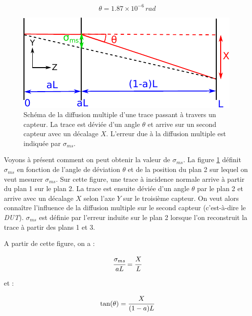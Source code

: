   \begin{equation}
   \theta = 1.87 \times 10^{-6} \, rad
  \end{equation}
  
  \begin{figure}[!htb]
    \begin{center}
      \includegraphics[scale=1.5]{./figures/diffusion_multiple.pdf}
      \caption{Sch\'ema de la diffusion multiple d'une trace passant \`a travers un capteur. La trace est d\'evi\'ee d'un angle $\theta$ et arrive sur un second capteur avec un d\'ecalage $X$. L'erreur due \`a la diffusion multiple est indiqu\'ee par $\sigma_{ms}$.}
      \label{fig:schema_diff_multiple}
    \end{center}
  \end{figure}  
  
  Voyons \`a pr\'esent comment on peut obtenir la valeur de $\sigma_{ms}$. La figure \ref{fig:schema_diff_multiple} d\'efinit $\sigma_{ms}$ en fonction de l'angle de d\'eviation $\theta$ et de la position du plan 2 sur lequel on veut mesurer $\sigma_{ms}$. Sur cette figure, une trace \`a incidence normale arrive \`a partir du plan 1 sur le plan 2. La trace est ensuite d\'evi\'ee d'un angle $\theta$ par le plan 2 et arrive avec un d\'ecalage $X$ selon l'axe $Y$ sur le troisi\`eme capteur. On veut alors connaître l'influence de la diffusion multiple sur le second capteur (c'est-à-dire le \textit{DUT}). $\sigma_{ms}$ est d\'efinie par l'erreur induite sur le plan 2 lorsque l'on reconstruit la trace \`a partir des plans 1 et 3. 
  
  \medskip
  
  A partir de cette figure, on a :
  
  \begin{equation}
   \cfrac{\sigma_{ms}}{aL} = \cfrac{X}{L}
   \label{eq:ms1}
  \end{equation}
   
   et :
   
  \begin{equation}
   \tan(\theta) = \cfrac{X}{(1-a)L}
   \label{eq:ms2}
  \end{equation}

